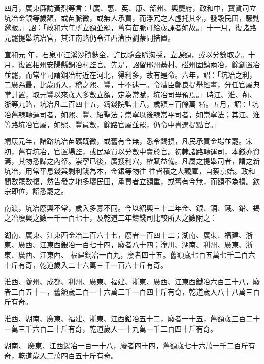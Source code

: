 \begin{pinyinscope}
 四月，廣東廉訪黃烈等言：「廣、惠、英、康、韶州、興慶府，政和中，寶貨司立坑冶金銀等歲額，或苗脈微，或無人承買，而浮冗之人虛托其名，發毀民田，騷動邀販。」詔：「政和六年所立額並罷，舊有苗脈可給歲課者如故。」十一月，復諸路元罷提舉坑冶官，其江南路仍令江西漕臣劉蒙同措置。



 宣和元
 年，石泉軍江溪沙磧麩金，許民隨金脈淘採，立課額，或以分數取之。十月，復置相州安陽縣銅冶村監官。先是，詔留邢州綦村、磁州固鎮兩冶，餘創置冶並罷，而常平司謂銅冶村近在河北，得利多，故有是命。六年，詔：「坑冶之利，二廣為最，比歲所入，稽之熙、豐，十不逮一。令漕臣鄭良提舉經畫，分任官屬典掌計置，取元豐以來歲入多數立額，定為常賦，坑冶司毋預焉。」時江、淮、荊、浙等九路，坑冶凡二百四十五，鑄錢院監十八，歲額三百餘萬
 緡。五月，詔：「坑冶舊隸轉運司者，如熙、豐、紹聖法；崇寧以後隸常平司者，如崇寧法；其江、淮等路坑冶官屬，如熙、豐員數，餘路官屬並罷，仍令中書選提點官。」



 靖康元年，諸路坑冶苗礦既微，或舊有今無，悉令蠲損，凡民承買金場並罷。宋初，舊有坑冶，官置場監，或民承買以分數中賣於官。初隸諸路轉運司，本錢亦資焉，其物悉歸之內帑。崇寧已後，廣搜利穴，榷賦益備。凡屬之提舉司者，謂之新坑冶，用常平息錢與剩利錢為本，金銀等物往
 往皆積之大觀庫，自蔡京始。政和間數罷數復，然告發之地多壞民田，承買者立額重，或舊有今無，而額不為損。欽宗即位，詔悉罷之。



 南渡，坑冶廢興不常，歲入多寡不同。今以紹興三十二年金、銀、銅、鐵、鉛、錫之冶廢興之數一千一百七十，及乾道二年鑄錢司比較所入之數附之：



 湖南、廣東、江東西金冶二百六十七，廢者一百四十二；湖南、廣東、福建、浙東、廣西、江東西銀冶一百七十四，廢者八十四；潼川、湖南、利州、廣東、浙東、廣西、江東西、
 福建銅冶一百九，廢者四十五。舊額歲七百五萬七千二百六十斤有奇，乾道歲入二十六萬三千一百六十斤有奇。



 淮西、夔州、成都、利州、廣東、福建、浙東、廣西、江東西鐵冶六百三十八，廢者二百五十一，舊額歲二百一十六萬二千一百四十斤有奇，乾道歲入八十八萬三百斤有奇。



 淮西、湖南、廣東、福建、浙東、江西鉛冶五十二，廢者一十五，舊額歲三百二十一萬三千六百二十斤有奇，乾道歲入一十九萬一千二百四十斤有奇。



 湖南、
 廣東、江西錫冶一百一十八，廢者四十四，舊額歲七十六萬一千二百斤有奇，乾道歲入二萬四百五十斤有奇。




\end{pinyinscope}
